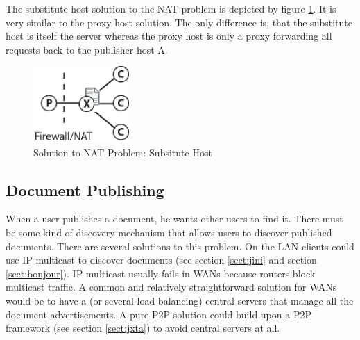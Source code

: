 \documentclass[11pt,a4paper]{article}
\begin{document}
The substitute host solution to the NAT problem is depicted by figure \ref{fig:substitute}. It is very similar to the proxy host solution. The only difference is, that the substitute host is itself the server whereas the proxy host is only a proxy forwarding all requests back to the publisher host A.

\begin{figure}[H]
 \centering
 \includegraphics[width=3.7cm,height=2.9cm]{../../images/net_substitute.eps}
 \caption{Solution to NAT Problem: Subsitute Host}
 \label{fig:substitute}
\end{figure}


\subsection{Document Publishing}
When a user publishes a document, he wants other users to find it. There must be some kind of discovery mechanism that allows users to discover published documents. There are several solutions to this problem. On the LAN clients could use IP multicast to discover documents (see section \ref{sect:jini} and section \ref{sect:bonjour}). IP multicast usually fails in WANs because routers block multicast traffic. A common and relatively straightforward solution for WANs would be to have a (or several load-balancing) central servers that manage all the document advertisements. A pure P2P solution could build upon a P2P framework (see section \ref{sect:jxta}) to avoid central servers at all.









\end{document}
